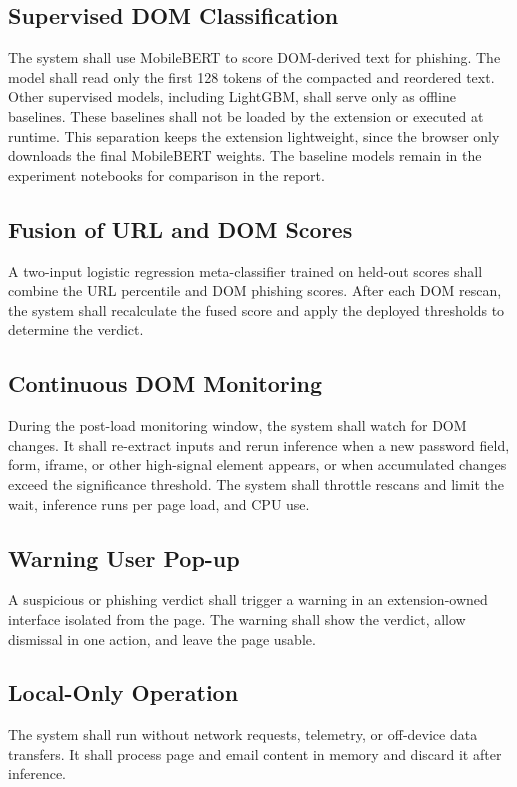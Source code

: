 \documentclass{FastFyp}
\begin{document}
\subsection{Supervised DOM Classification}
The system shall use MobileBERT to score DOM-derived text for phishing. The model shall read only the first 128 tokens of the compacted and reordered text. Other supervised models, including LightGBM, shall serve only as offline baselines. These baselines shall not be loaded by the extension or executed at runtime. This separation keeps the extension lightweight, since the browser only downloads the final MobileBERT weights. The baseline models remain in the experiment notebooks for comparison in the report.

\subsection{Fusion of URL and DOM Scores}
A two-input logistic regression meta-classifier trained on held-out scores shall combine the URL percentile and DOM phishing scores. After each DOM rescan, the system shall recalculate the fused score and apply the deployed thresholds to determine the verdict.

\subsection{Continuous DOM Monitoring}
During the post-load monitoring window, the system shall watch for DOM changes. It shall re-extract inputs and rerun inference when a new password field, form, iframe, or other high-signal element appears, or when accumulated changes exceed the significance threshold. The system shall throttle rescans and limit the wait, inference runs per page load, and CPU use.

\subsection{Warning User Pop-up}
A suspicious or phishing verdict shall trigger a warning in an extension-owned interface isolated from the page. The warning shall show the verdict, allow dismissal in one action, and leave the page usable.

\subsection{Local-Only Operation}
The system shall run without network requests, telemetry, or off-device data transfers. It shall process page and email content in memory and discard it after inference.
\end{document}
